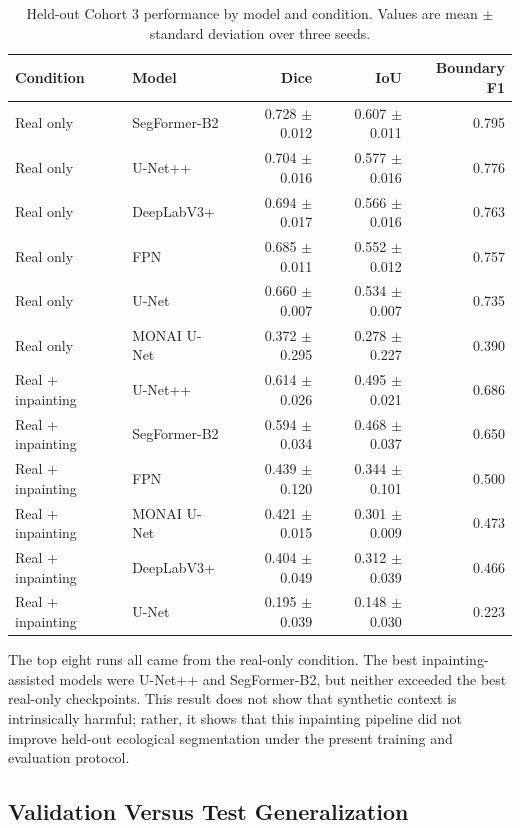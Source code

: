 \documentclass[11pt]{article}
\begin{document}
\begin{table}[H]
  \centering
  \caption{Held-out Cohort 3 performance by model and condition. Values are mean $\pm$ standard deviation over three seeds.}
  \label{tab:model-results}
  \begin{tabular}{llrrr}
    \toprule
    \textbf{Condition} & \textbf{Model} & \textbf{Dice} & \textbf{IoU} & \textbf{Boundary F1} \\
    \midrule
    Real only & SegFormer-B2 & 0.728 $\pm$ 0.012 & 0.607 $\pm$ 0.011 & 0.795 \\
    Real only & U-Net++ & 0.704 $\pm$ 0.016 & 0.577 $\pm$ 0.016 & 0.776 \\
    Real only & DeepLabV3+ & 0.694 $\pm$ 0.017 & 0.566 $\pm$ 0.016 & 0.763 \\
    Real only & FPN & 0.685 $\pm$ 0.011 & 0.552 $\pm$ 0.012 & 0.757 \\
    Real only & U-Net & 0.660 $\pm$ 0.007 & 0.534 $\pm$ 0.007 & 0.735 \\
    Real only & MONAI U-Net & 0.372 $\pm$ 0.295 & 0.278 $\pm$ 0.227 & 0.390 \\
    \midrule
    Real + inpainting & U-Net++ & 0.614 $\pm$ 0.026 & 0.495 $\pm$ 0.021 & 0.686 \\
    Real + inpainting & SegFormer-B2 & 0.594 $\pm$ 0.034 & 0.468 $\pm$ 0.037 & 0.650 \\
    Real + inpainting & FPN & 0.439 $\pm$ 0.120 & 0.344 $\pm$ 0.101 & 0.500 \\
    Real + inpainting & MONAI U-Net & 0.421 $\pm$ 0.015 & 0.301 $\pm$ 0.009 & 0.473 \\
    Real + inpainting & DeepLabV3+ & 0.404 $\pm$ 0.049 & 0.312 $\pm$ 0.039 & 0.466 \\
    Real + inpainting & U-Net & 0.195 $\pm$ 0.039 & 0.148 $\pm$ 0.030 & 0.223 \\
    \bottomrule
  \end{tabular}
\end{table}

The top eight runs all came from the real-only condition. The best inpainting-assisted models were U-Net++ and SegFormer-B2, but neither exceeded the best real-only checkpoints. This result does not show that synthetic context is intrinsically harmful; rather, it shows that this inpainting pipeline did not improve held-out ecological segmentation under the present training and evaluation protocol.

\subsection{Validation Versus Test Generalization}
\end{document}
